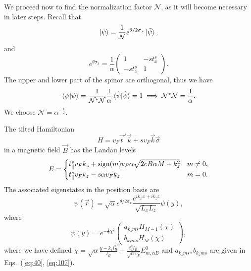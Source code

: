 We proceed now to find the normalization factor \( \mathcal{N} \), as it will become necessary in later steps.
Recall that
\[
  \ket{\psi} = \frac{1}{\mathcal{N}} e^{\theta /2 \sigma _x} \ket{\tilde{\psi}},
\]
and
\[
e^{\theta \sigma _x} =
\frac{1}{\alpha }
\begin{pmatrix}
  1 & -s t^s_x\\
  -s t^s_x & 1
\end{pmatrix}.
\]
The upper and lower part of the spinor are orthogonal, thus we have
\begin{equation}
  \label{eq:41}
  \braket{\psi  | \psi } = \frac{1}{\mathcal{N}^{*} \mathcal{N}} \frac{1}{\alpha } \braket{\tilde{\psi}  | \tilde{\psi} } = 1 \implies \mathcal{N}^{*}\mathcal{N} = \frac{1}{\alpha }.
\end{equation}
We choose \( \mathcal{N} = \alpha^{-\frac{1}{2}} \).

\begin{summary}\label{summary:llevels}
The tilted Hamiltonian
  \[
    H = v_F \vec{t}^s \vec{k} + s v_F \vec{k} \vec{\sigma}
  \]
  in a magnetic field \( \vec{B} \) has the Landau levels
  \[
    E =
    \begin{cases}
      t^s_{\parallel} v_F k_z + \operatorname{sign}(m) v_F \alpha \sqrt{2 e B \alpha M + k_{z} ^2} & m \neq 0,\\
      t^s_{\parallel} v_F k_z - s \alpha v_F k_z & m = 0.
    \end{cases}
  \]
  The associated eigenstates in the position basis are
  \[
    \psi(\vec{r}) = \sqrt{\alpha} e^{\theta /2 \sigma_x}
    \frac{
      e^{ik_{x} x + ik_{z} z}
    }{
      \sqrt{L_{x}  L_z}
    } \psi(y),
    \]
    where
    \[
      \psi(y) = e^{-\frac{1}{2} \chi^2}
      \begin{pmatrix}
        a_{k_z m s} H_{M - 1} (\chi) \\
        b_{k_z m s} H_M (\chi)
      \end{pmatrix},
    \]
    where we have defined \( \chi = \sqrt{\alpha} \frac{ y - k_x l_B^2 }{l_{B}} + \frac{t^s_x l_B}{\sqrt{\alpha} v_{F}} E^0_{m, \alpha B} \) and \( a_{k_z m s}, b_{k_z m s} \) are given in Eqs.~(\ref{eq:40}, \ref{eq:107}).
\end{summary}
